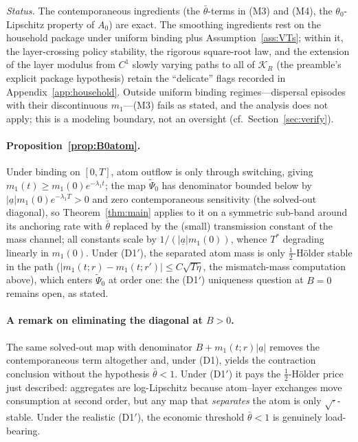 \documentclass[11pt]{article}
\theoremstyle{definition}
\theoremstyle{remark}
\newcommand{\ubar}[1]{\underline{#1}}
\newcommand{\Kcal}{\mathcal{K}}
\newcommand{\uba}{\ubar{a}}
\begin{document}
\emph{Status.} The contemporaneous ingredients (the
$\bar\theta$-terms in (M3) and (M4), the $\theta_0$-Lipschitz
property of $A_0$) are exact. The smoothing ingredients rest on the
household package under uniform binding plus
Assumption~\ref{ass:VTs}; within it, the layer-crossing policy
stability, the rigorous square-root law, and the extension of the
layer modulus from $C^1$ slowly varying paths to all of $\Kcal_R$
(the preamble's explicit package hypothesis) retain the ``delicate''
flags recorded in Appendix~\ref{app:household}. Outside uniform
binding regimes---dispersal episodes with their discontinuous
$m_1$---(M3) fails as stated, and the analysis does not apply; this
is a modeling boundary, not an oversight
(cf.\ Section~\ref{sec:verify}).

\paragraph{Proposition~\ref{prop:B0atom}.} Under binding on $[0,T]$,
atom outflow is only through switching, giving
$m_1(t)\ge m_1(0)e^{-\lambda_1t}$; the map $\widetilde\Psi_0$ has
denominator bounded below by $|\uba|m_1(0)e^{-\lambda_1T}>0$ and
zero contemporaneous sensitivity (the solved-out diagonal), so
Theorem~\ref{thm:main} applies to it on a symmetric sub-band around
its anchoring rate with $\bar\theta$ replaced by the (small)
transmission constant of the mass channel; all constants scale by
$1/(|\uba|m_1(0))$, whence $T^*$ degrading linearly in $m_1(0)$.
Under (D1$'$), the separated atom mass is only
$\tfrac12$-H\"older stable in the path
($|m_1(t;r)-m_1(t;r')|\le C\sqrt{T\eta}$, the mismatch-mass
computation above), which enters $\widetilde\Psi_0$ at order one: the
(D1$'$) uniqueness question at $B=0$ remains open, as stated.

\paragraph{A remark on eliminating the diagonal at $B>0$.} The same
solved-out map with denominator $B+m_1(t;r)|\uba|$ removes the
contemporaneous term altogether and, under (D1), yields the
contraction conclusion without the hypothesis $\bar\theta<1$. Under
(D1$'$) it pays the $\tfrac12$-H\"older price just described:
aggregates are log-Lipschitz because atom--layer exchanges move
consumption at second order, but any map that \emph{separates} the
atom is only $\sqrt{\cdot}$-stable. Under the realistic (D1$'$), the
economic threshold $\bar\theta<1$ is genuinely load-bearing.
\end{document}
